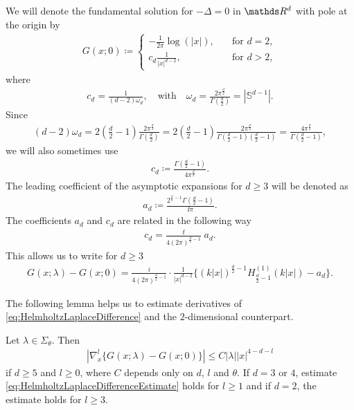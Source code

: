 We will denote the fundamental solution for $-\Delta = 0$ in $\R^d$ with pole at the origin by
\begin{align*}
  G(x;0) \coloneqq \begin{cases} -\frac{1}{2\pi} \log(|x|), &\quad\text{for } d = 2, \\c_d \frac{1}{|x|^{d - 2}}, &\quad\text{for } d > 2,  \end{cases}
\end{align*}
where
\begin{align*}
  c_d = \frac{1}{(d - 2) \omega_d}, \quad\text{with}\quad \omega_d = \frac{2\pi^{\frac{d}{2}}}{\Gamma(\frac{d}{2})} = |\mathbb{S}^{d - 1}|.
\end{align*}
Since
\begin{align*}
  (d - 2) \omega_d 
  = 2 ( \frac{d}{2} - 1) \frac{2 \pi^{\frac{d}{2}}}{\Gamma(\frac{d}{2})}
  =  2 (\frac{d}{2} - 1) \frac{2 \pi^{\frac{d}{2}}}{\Gamma(\frac{d}{2} - 1)(\frac{d}{2} - 1)}
  = \frac{4 \pi^{\frac{d}{2}}}{\Gamma(\frac{d}{2} - 1)},
\end{align*}
we will also sometimes use
\begin{align*}
  c_d \coloneqq \frac{\Gamma(\frac{d}{2} - 1)}{4 \pi^{\frac{d}{2}}}.
\end{align*}
The leading coefficient of the asymptotic expansions for $d \geq 3$ will be denoted as
\begin{align}
  \label{eq:Defnad}
  a_d \coloneqq \frac{2^{\frac{d}{2} - 1} \Gamma(\frac{d}{2} - 1)}{\ii \pi}.
\end{align}
The coefficients $a_d$ and $c_d$ are related in the following way
\begin{align*}
  c_d 
  =\frac{\ii} {4 (2 \pi)^{\frac{d}{2} - 1}}\; a_d .
\end{align*}
This allows us to write for $d \geq 3$
\begin{align}
  \label{eq:HelmholtzLaplaceDifference}
  G(x;\lambda) - G(x; 0) = \frac{i}{4(2\pi)^{\frac{d}{2} - 1}} \cdot \frac{1}{|x|^{d - 2}} \Big\{ (k|x|)^{\frac{d}{2} - 1} H_{\frac{d}{2} - 1}^{(1)}(k|x|) - a_d \Big\}.
\end{align}

The following lemma helps us to estimate derivatives of \eqref{eq:HelmholtzLaplaceDifference} and the $2$-dimensional counterpart.

\begin{lem}
  \label{lem:HelmholtzLaplaceDifference}
  Let $\lambda \in \Sigma_\theta$.
  Then
  \begin{align}
    \label{eq:HelmholtzLaplaceDifferenceEstimate}
    |\nabla_x^l \{ G(x; \lambda) - G(x; 0) \}| \leq C |\lambda| |x|^{4 - d - l}
  \end{align}
  if $d \geq 5$ and $l \geq 0$, where $C$ depends only on $d$, $l$ and $\theta$.
  If $d = 3$ or $4$, estimate \eqref{eq:HelmholtzLaplaceDifferenceEstimate} holds for $l \geq 1$ and if $d = 2$, the estimate holds for $l \geq 3$.
\end{lem}

